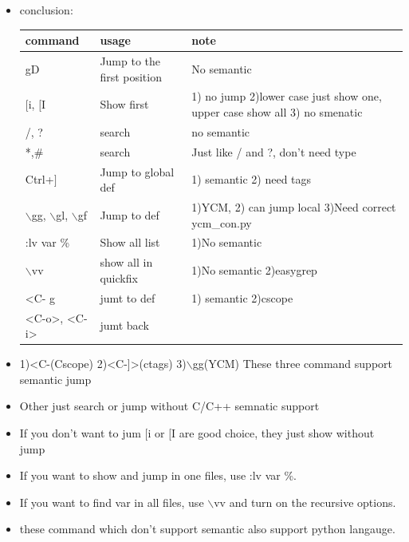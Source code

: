 \documentclass[a4paper,12pt,twoside]{book}
\begin{document}
\begin{itemize}
		\item conclusion: 
\begin{center}
		\begin{tabular}{p{}|p{}|p{}}
		\hline
		command & usage & note\\

   	    \hline 
		gD & Jump to the first position & No semantic  \\
	
		\hline 
		$[$i, $[$I & Show first & 1) no jump 2)lower case just show one, upper case show all  3) no smenatic\\
	
		\hline 
		/, ? & search & no semantic  \\
		
		\hline 
		*,\# & search & Just like / and ?, don't need type  \\

		\hline 
		Ctrl+$]$ &Jump to global def & 1) semantic 2) need tags \\
		
		\hline 
		$\backslash$gg, $\backslash$gl, $\backslash$gf & Jump to def & 1)YCM, 2) can jump local 3)Need correct ycm\_con.py  \\
		
		\hline 
		:lv var \% & Show all list & 1)No semantic  \\
		
		\hline 
		$\backslash$vv & show all in quickfix & 1)No semantic 2)easygrep\\

       \hline
	   <C-\> g & jumt to def & 1) semantic 2)cscope \\

       \hline
	   <C-o>, <C-i> & jumt back &  \\

		\end{tabular}
	\end{center}
	\item 1)<C-\>(Cscope) 2)<C-]>(ctags) 3)$\backslash$gg(YCM) These three command support semantic jump
	\item Other just search or jump without C/C++ semnatic support
	\item If you don't want to jum $[$i or $[$I are good choice, they just show without jump
	\item If you want to show and jump in one files, use :lv var \%. 
	\item If you want to find var in all files, use $\backslash$vv and turn on the recursive options.  
	\item these command which don't support semantic also support python langauge. 
	\end{itemize}
	
\end{document}
